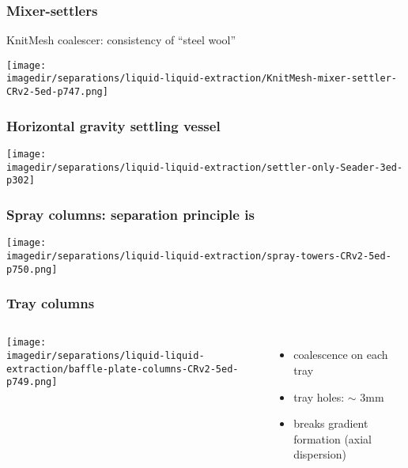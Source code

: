 \begin{frame}\frametitle{Mixer-settlers}
	KnitMesh coalescer: consistency of ``steel wool''
	\begin{center}
		\texttt{[image: \\imagedir/separations/liquid-liquid-extraction/KnitMesh-mixer-settler-CRv2-5ed-p747.png]}
	\end{center}
\end{frame}

\begin{frame}\frametitle{Horizontal gravity settling vessel}
	\begin{center}
		\texttt{[image: \\imagedir/separations/liquid-liquid-extraction/settler-only-Seader-3ed-p302]}
	\end{center}
\end{frame}

\begin{frame}\frametitle{Spray columns: separation principle is {\color{myRed}{gravity}}}
	\begin{center}
		\texttt{[image: \\imagedir/separations/liquid-liquid-extraction/spray-towers-CRv2-5ed-p750.png]}
	\end{center}
	\vspace{-14pt}
\end{frame}

\begin{frame}\frametitle{Tray columns}
	\begin{columns}[t]
			\vspace{-0.5cm}
			\begin{center}
				\texttt{[image: \\imagedir/separations/liquid-liquid-extraction/baffle-plate-columns-CRv2-5ed-p749.png]}
			\end{center}
			\vspace{-20pt}
			\begin{itemize}
				\item	coalescence on each tray
				\item	tray holes: $\sim$ 3mm
				\item	breaks gradient formation (axial dispersion)
			\end{itemize}
	\end{columns}
\end{frame}

